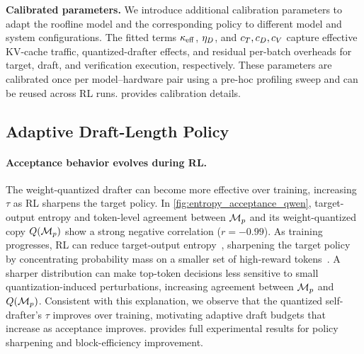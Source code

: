 \textbf{Calibrated parameters.}
We introduce additional calibration parameters to adapt the roofline model and the corresponding policy to different model and system configurations.
The fitted terms $\kappa_{\mathrm{eff}}$, $\eta_D$, and 
$c_T,c_D,c_V$ capture effective KV-cache traffic, quantized-drafter effects, and residual per-batch overheads for target, draft, and verification execution, respectively.
These parameters are calibrated once per model--hardware pair using a pre-hoc profiling sweep and can be reused across RL runs.  provides calibration details.


\subsection{Adaptive Draft-Length Policy}
\label{subsec:adaptive-gamma}

\paragraph{Acceptance behavior evolves during RL.}
The weight-quantized drafter can become more effective over training, increasing $\tau$ as RL sharpens the target policy.
In \cref{fig:entropy_acceptance_qwen}, target-output entropy and token-level agreement between $\mathcal{M}_{p}$ and its weight-quantized copy $Q(\mathcal{M}_{p})$ show a strong negative correlation ($r=-0.99$).
As training progresses, RL can reduce target-output entropy~\citep{jin2025revisiting,cui2025entropy}, sharpening the target policy by concentrating probability mass on a smaller set of high-reward tokens~\citep{huang2024self,yang2025llm}.
A sharper distribution can make top-token decisions less sensitive to small quantization-induced perturbations, increasing agreement between $\mathcal{M}_{p}$ and $Q(\mathcal{M}_{p})$.
Consistent with this explanation, we observe that the quantized self-drafter's $\tau$ improves over training, motivating adaptive draft budgets that increase as acceptance improves.
 provides full experimental results for policy sharpening and block-efficiency improvement.


